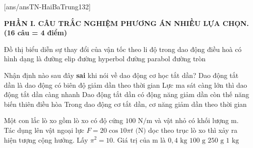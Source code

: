 [ans/ansTN-HaiBaTrung132]

\noindent \textbf{PHẦN I. CÂU TRẮC NGHIỆM PHƯƠNG ÁN NHIỀU LỰA CHỌN. (16 câu = 4 điểm)}

\begin{ex}%
	Đồ thị biểu diễn sự thay đổi của vận tốc theo li độ trong dao động điều hoà có hình dạng là
	\choice
	{\True đường elip}
	{đường hyperbol}
	{đường parabol}
	{đường tròn}
\end{ex}

\begin{ex}%
	Nhận định nào sau đây \textbf{sai} khi nói về dao động cơ học tắt dần?
	\choice
	{Dao động tắt dần là dao động có biên độ giảm dần theo thời gian}
	{Lực ma sát càng lớn thì dao động tắt dần càng nhanh}
	{\True Dao động tắt dần có động năng giảm dần còn thế năng biến thiên điều hòa}
	{Trong dao động cơ tắt dần, cơ năng giảm dần theo thời gian}
\end{ex}

\begin{ex}%
	Một con lắc lò xo gồm lò xo có độ cứng $100\text{ N/m}$ và vật nhỏ có khối lượng m. Tác dụng lên vật ngoại lực $F=20 \cos 10 \pi t\text{ (N)}$ dọc theo trục lò xo thì xảy ra hiện tượng cộng hưởng. Lấy $\pi^{2}=10$. Giá trị của m là
	\choice
	{$0,4\text{ kg}$}
	{$100\text{ g}$}
	{$250\text{ g}$}
	{\True $1\text{ kg}$}
\end{ex}

